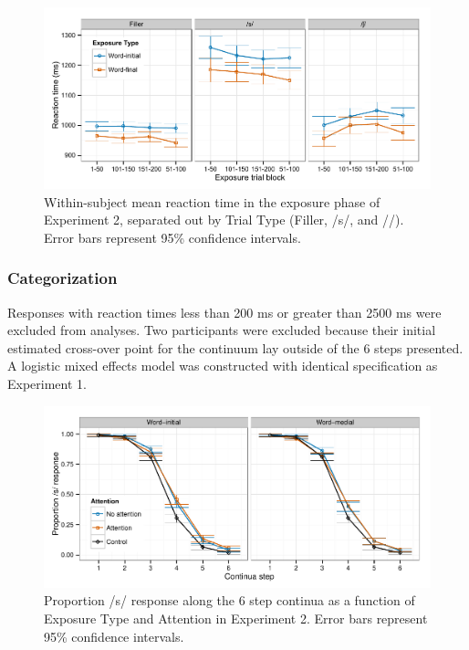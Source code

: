 
\begin{figure}[!ht]
\caption{Within-subject mean reaction time in the exposure phase of Experiment 2, separated out by Trial Type (Filler, /s/, and /\textesh/). Error bars represent 95\% confidence intervals.}
\label{fig:exp2exposert}
\begin{center}
\includegraphics[width=\textwidth]{graphs/exp2_exprt}
\end{center}
\end{figure}

\subsubsection{Categorization}

Responses with reaction times less than 200 ms or greater than 2500 ms were excluded from analyses. 
Two participants were excluded because their initial estimated cross-over point for the continuum lay outside of the 6 steps presented.  
A logistic mixed effects model was constructed with identical specification as Experiment 1.

\begin{figure}[!ht]
\caption{Proportion /s/ response along the 6 step continua as a function of Exposure Type and Attention in Experiment 2. Error bars represent 95\% confidence intervals.}
\label{fig:exp2categ}
\begin{center}
\includegraphics[width=\textwidth]{graphs/exp2_categresults}
\end{center}
\end{figure}

